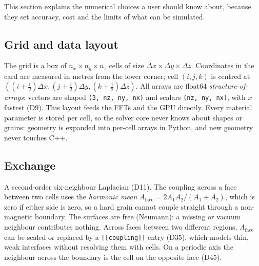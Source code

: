\documentclass[10pt,a4paper]{article}
\newcommand{\code}[1]{\texttt{#1}}
\newcommand{\dec}[1]{\textcolor{comment}{\small(#1)}}
\begin{document}
This section explains the numerical choices a user should know about, because they set accuracy, cost and the limits
of what can be simulated.

\subsection{Grid and data layout}
\label{sec:layout}
The grid is a box of $n_x\times n_y\times n_z$ cells of size $\Delta x\times\Delta y\times\Delta z$. Coordinates in the
card are measured in metres from the lower corner; cell $(i,j,k)$ is centred at
$((i+\frac12)\Delta x, (j+\frac12)\Delta y, (k+\frac12)\Delta z)$. All arrays are float64 \emph{structure-of-arrays}:
vectors are shaped \code{(3, nz, ny, nx)} and scalars \code{(nz, ny, nx)}, with $x$ fastest \dec{D9}. This layout feeds
the FFTs and the GPU directly. Every material parameter is stored per cell, so the solver core never knows about shapes
or grains: geometry is expanded into per-cell arrays in Python, and new geometry never touches C++.

\subsection{Exchange}
A second-order six-neighbour Laplacian \dec{D11}. The coupling across a face between two cells uses the
\emph{harmonic mean} $A_\mathrm{face} = 2A_1A_2/(A_1+A_2)$, which is zero if either side is zero, so a hard grain cannot
couple straight through a non-magnetic boundary. The surfaces are free (Neumann): a missing or vacuum neighbour
contributes nothing. Across faces between two different regions, $A_\mathrm{face}$ can be scaled or replaced by a
\code{[[coupling]]} entry \dec{D35}, which models thin, weak interfaces without resolving them with cells. On a periodic
axis the neighbour across the boundary is the cell on the opposite face \dec{D45}.
\end{document}
